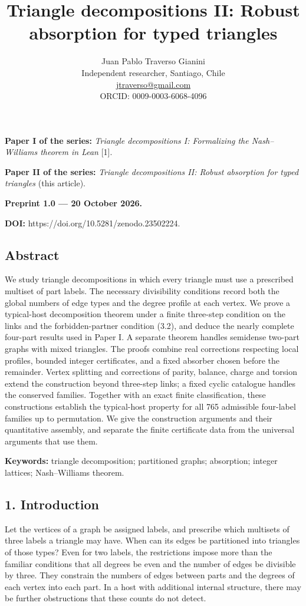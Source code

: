 \documentclass[english,11pt,a4paper]{article}
\title{Triangle decompositions II: Robust absorption for typed triangles}
\author{Juan Pablo Traverso Gianini\\
\small Independent researcher, Santiago, Chile\\
\small \href{mailto:jtraverso@gmail.com}{jtraverso@gmail.com}\\
\small ORCID: 0009-0003-6068-4096}
\date{}
\begin{document}
\raggedbottom
\maketitle
\textbf{Paper I of the series:} \emph{Triangle decompositions I: Formalizing the Nash--Williams theorem in Lean} {[}1{]}.

\textbf{Paper II of the series:} \emph{Triangle decompositions II: Robust absorption for typed triangles} (this article).

\textbf{Preprint 1.0 --- 20 October 2026.}

\textbf{DOI:} https://doi.org/10.5281/zenodo.23502224.

\subsection{Abstract}\label{abstract}

We study triangle decompositions in which every triangle must use a prescribed multiset of part labels. The necessary divisibility conditions record both the global numbers of edge types and the degree profile at each vertex. We prove a typical-host decomposition theorem under a finite three-step condition on the links and the forbidden-partner condition (3.2), and deduce the nearly complete four-part results used in Paper I. A separate theorem handles semidense two-part graphs with mixed triangles. The proofs combine real corrections respecting local profiles, bounded integer certificates, and a fixed absorber chosen before the remainder. Vertex splitting and corrections of parity, balance, charge and torsion extend the construction beyond three-step links; a fixed cyclic catalogue handles the conserved families. Together with an exact finite classification, these constructions establish the typical-host property for all 765 admissible four-label families up to permutation. We give the construction arguments and their quantitative assembly, and separate the finite certificate data from the universal arguments that use them.

\textbf{Keywords:} triangle decomposition; partitioned graphs; absorption; integer lattices; Nash--Williams theorem.

\subsection{1. Introduction}\label{introduction}

Let the vertices of a graph be assigned labels, and prescribe which multisets of three labels a triangle may have. When can its edges be partitioned into triangles of those types? Even for two labels, the restrictions impose more than the familiar conditions that all degrees be even and the number of edges be divisible by three. They constrain the numbers of edges between parts and the degrees of each vertex into each part. In a host with additional internal structure, there may be further obstructions that these counts do not detect.
\end{document}

